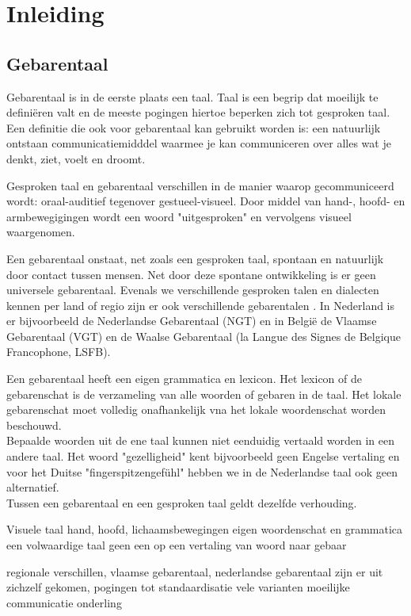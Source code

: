 \chapter{Inleiding}
\section{Gebarentaal}

Gebarentaal is in de eerste plaats een taal. Taal is een begrip dat moeilijk te defini\"eren valt en de meeste pogingen hiertoe beperken zich tot gesproken taal. Een definitie die ook voor gebarentaal kan gebruikt worden is: een natuurlijk ontstaan communicatiemidddel waarmee je kan communiceren over alles wat je denkt, ziet, voelt en droomt. \cite{bron}

\npar Gesproken taal en gebarentaal verschillen in de manier waarop gecommuniceerd wordt: oraal-auditief tegenover gestueel-visueel. Door middel van hand-, hoofd- en armbewegigingen wordt een woord "uitgesproken" en vervolgens visueel waargenomen.

\npar Een gebarentaal onstaat, net zoals een gesproken taal, spontaan en natuurlijk door contact tussen mensen. Net door deze spontane ontwikkeling is er geen universele gebarentaal. Evenals we verschillende gesproken talen en dialecten kennen per land of regio zijn er ook verschillende gebarentalen \cite{bron-mothi}. In Nederland is er bijvoorbeeld de Nederlandse Gebarentaal (NGT) en in Belgi\"e de Vlaamse Gebarentaal (VGT) en de Waalse Gebarentaal (la Langue des Signes de Belgique Francophone, LSFB).

\npar Een gebarentaal heeft een eigen grammatica en lexicon. Het lexicon of de gebarenschat is de verzameling van alle woorden of gebaren in de taal. Het lokale gebarenschat moet volledig onafhankelijk vna het lokale woordenschat worden beschouwd.
\\Bepaalde woorden uit de ene taal kunnen niet eenduidig vertaald worden in een andere taal. Het woord "gezelligheid" kent bijvoorbeeld geen Engelse vertaling en voor het Duitse "fingerspitzengef\"uhl" hebben we in de Nederlandse taal ook geen alternatief.
\\Tussen een gebarentaal en een gesproken taal geldt dezelfde verhouding. 


Visuele taal
hand, hoofd, lichaamsbewegingen
eigen woordenschat en grammatica
een volwaardige taal
geen een op een vertaling van woord naar gebaar

regionale verschillen, vlaamse gebarentaal, nederlandse gebarentaal
zijn er uit zichzelf gekomen, pogingen tot standaardisatie
vele varianten
moeilijke communicatie onderling

